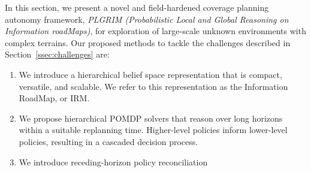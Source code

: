 \documentclass[letterpaper]{article} %
\newcommand{\phdone}[1]{} %
\begin{document}
\phdone{Framework Overview}
In this section, we present a novel and field-hardened coverage planning autonomy framework, \textit{PLGRIM (Probabilistic Local and Global Reasoning on Information roadMaps)}, for exploration of large-scale unknown environments with complex terrains.
Our proposed methods to tackle the challenges described in Section~\ref{ssec:challenges} are:


\vspace{-4pt}
\begin{enumerate}[label={\arabic*)}]
  \itemsep0em 
  \setlength{\itemsep}{0pt}
  \setlength{\parskip}{0pt}
  \item \label{en:idea1} We introduce a hierarchical belief space representation that is compact, versatile, and scalable. We refer to this representation as the Information RoadMap, or IRM. 
  \item \label{en:idea2} We propose hierarchical POMDP solvers that reason over long horizons within a suitable replanning time. Higher-level policies inform lower-level policies, resulting in a cascaded decision process.
  \item \label{en:idea4} We introduce receding-horizon policy reconciliation 
\end{enumerate}
\vspace{-1pt}
\end{document}
